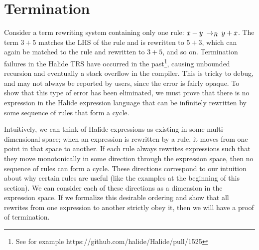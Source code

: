\chapter{Termination}
\label{sec:termination}


Consider a term
rewriting system containing only one rule: $x + y \:\rightarrow_{R}\: y + x$. The term
$3 + 5$ matches the LHS of the rule and is rewritten to $5 + 3$, which can again
be matched to the rule and rewritten to $3 + 5$, and so on. Termination failures in the Halide TRS have occurred in the past\footnote{See for example https://github.com/halide/Halide/pull/1525}, causing unbounded recursion and eventually a stack overflow in the compiler. This is tricky to debug, and may not always be reported by users, since the error is fairly opaque. To show that this type of error has been eliminated, we must prove that there is no expression in the Halide expression language that can be infinitely rewritten by some sequence of rules that form a cycle.

Intuitively, we can think of Halide expressions as existing in some multi-dimensional space; when an expression is rewritten by a rule, it moves from one point in that space to another. If each rule always rewrites expressions such that they move monotonically in some direction through the expression space, then no sequence of rules can form a cycle. These directions correspond to our intuition about why certain rules are useful (like the examples at the beginning of this section). We can consider each of these directions as a dimension in the expression space. If we formalize this desirable ordering and show that all rewrites from one expression to another strictly obey it, then we will have a proof of termination.

